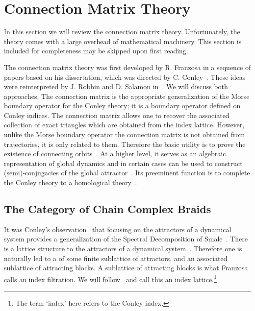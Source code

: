 
\section{Connection Matrix Theory}\label{sec:CMT}

In this section we will review the connection matrix theory.  Unfortunately, the theory comes with a large overhead of mathematical machinery.  This section is included for completeness may be skipped upon first reading.

The connection matrix theory was first developed by R. Franzosa in a sequence of papers based on his dissertation, which was directed by C. Conley~\cite{fran2,fran,fran3}.  These ideas were reinterpreted by J. Robbin and D. Salamon in~\cite{salamon}.  We will discuss both approaches.  The connection matrix is the appropriate generalization of the Morse boundary operator for the Conley theory; it is a boundary operator defined on Conley indices.   The connection matrix allows one to recover the associated collection of exact triangles which are obtained from the index lattice.  However, unlike the Morse boundary operator the connection matrix is not obtained from trajectories, it is only related to them.  Therefore the basic utility is to prove the existence of connecting orbits~\cite{mpmw}.  At a higher level, it serves as an algebraic representation of global dynamics and in certain cases can be used to construct (semi)-conjugacies of the global attractor~\cite{dhmo,mcmodels,scalar}. Its preeminent function is to complete the Conley theory to a homological theory~\cite{mc}.  


\subsection{The Category of Chain Complex Braids}
It was Conley's observation~\cite{conley} that focusing on the attractors of a dynamical system provides a generalization of the Spectral Decomposition of Smale~\cite[Theorem 6.2]{smale}.  There is a lattice structure to the attractors of a dynamical system~\cite{salamon,lsa,lsa2}.  Therefore one is naturally led to a of some finite sublattice of attractors, and an associated sublattice of attracting blocks.  A sublattice of attracting blocks is what Franzosa calls an index filtration.  We will follow~\cite{lsa} and call this an index lattice.\footnote{The term `index' here refers to the Conley index.}

